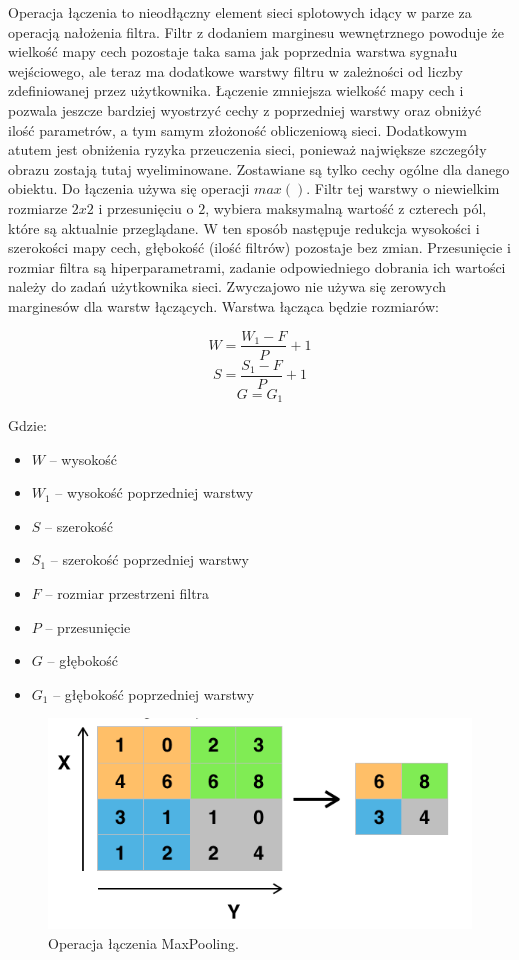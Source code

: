 \documentclass[12pt,a4paper,twoside,titlepage,openright]{book}
\begin{document}
Operacja łączenia to nieodłączny element sieci splotowych idący w parze za operacją nałożenia filtra. Filtr z dodaniem marginesu wewnętrznego  powoduje że wielkość mapy cech pozostaje taka sama jak poprzednia warstwa sygnału wejściowego, ale teraz ma dodatkowe warstwy filtru w zależności od liczby zdefiniowanej przez użytkownika. Łączenie zmniejsza wielkość mapy cech i pozwala jeszcze bardziej wyostrzyć cechy z poprzedniej warstwy oraz obniżyć ilość parametrów, a tym samym złożoność obliczeniową sieci. Dodatkowym atutem jest obniżenia ryzyka przeuczenia sieci, ponieważ największe szczegóły obrazu zostają tutaj wyeliminowane. Zostawiane są tylko cechy ogólne dla danego obiektu. Do łączenia używa się operacji $max()$. Filtr tej warstwy o niewielkim rozmiarze $2x2$ i przesunięciu o $2$, wybiera maksymalną wartość z czterech pól, które są aktualnie przeglądane. W ten sposób następuje redukcja wysokości i szerokości mapy cech, głębokość (ilość filtrów) pozostaje  bez zmian. Przesunięcie i rozmiar filtra są hiperparametrami, zadanie odpowiedniego dobrania ich wartości należy do zadań użytkownika sieci. Zwyczajowo nie używa się zerowych marginesów dla warstw łączących. Warstwa łącząca będzie rozmiarów:

$$ W = \frac{W_1 - F}{P} + 1 $$
$$ S = \frac{S_1 - F}{P} + 1 $$
$$ G = G_1 $$

Gdzie:
\begin{itemize}
\item $W$ -- wysokość
\item $W_1$ -- wysokość poprzedniej warstwy
\item $S$ -- szerokość
\item $S_1$ -- szerokość poprzedniej warstwy
\item $F$ -- rozmiar przestrzeni filtra
\item $P$ -- przesunięcie
\item $G$ -- głębokość
\item $G_1$ -- głębokość poprzedniej warstwy
\end{itemize}

\begin{figure}[ht]
	\centering
			\includegraphics[resolution=100, scale=0.6]{MaxPooling.png}
		\caption{Operacja łączenia MaxPooling.}
\end{figure}
\end{document}
